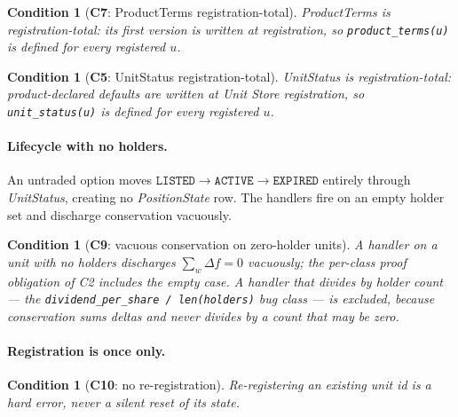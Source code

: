 \documentclass[11pt,a4paper]{article}
\newtheorem{condition}[definition]{Condition}
\begin{document}
\begin{condition}[\textbf{C7}: ProductTerms registration-total]
\emph{ProductTerms} is registration-total: its first version is written at registration, so
\texttt{product\_terms(u)} is defined for every registered $u$.
\end{condition}

\begin{condition}[\textbf{C5}: UnitStatus registration-total]
\emph{UnitStatus} is registration-total: product-declared defaults are written at Unit Store
registration, so \texttt{unit\_status(u)} is defined for every registered $u$.
\end{condition}

\paragraph{Lifecycle with no holders.}
An untraded option moves $\texttt{LISTED}\to\texttt{ACTIVE}\to\texttt{EXPIRED}$ entirely
through \emph{UnitStatus}, creating no \emph{PositionState} row. The handlers fire on an
empty holder set and discharge conservation vacuously.

\begin{condition}[\textbf{C9}: vacuous conservation on zero-holder units]
A handler on a unit with no holders discharges $\sum_w\Delta f=0$ vacuously; the per-class
proof obligation of C2 includes the empty case. A handler that divides by holder count ---
the \texttt{dividend\_per\_share / len(holders)} bug class --- is excluded, because
conservation sums deltas and never divides by a count that may be zero.
\end{condition}

\paragraph{Registration is once only.}
\begin{condition}[\textbf{C10}: no re-registration]
Re-registering an existing unit id is a hard error, never a silent reset of its state.
\end{condition}
\end{document}
